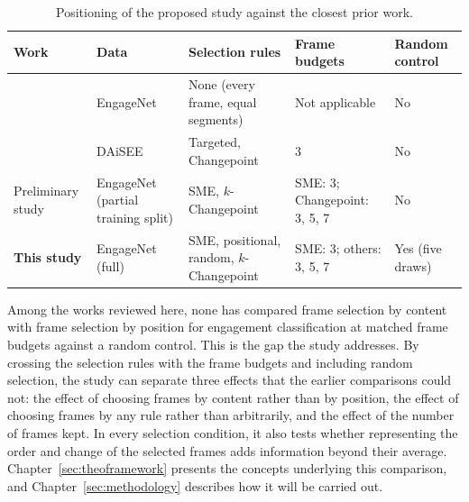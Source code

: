 \begin{table}[t]
   \centering
   \caption[Positioning of the proposed study]{Positioning of the proposed study against the closest prior work.}
   \label{tab:rw-positioning}
   \small
   \begin{tabular}{L{2.4cm}L{2.0cm}L{3.2cm}L{2.3cm}L{1.8cm}}
      \toprule
      Work & Data & Selection rules & Frame budgets & Random control \\
      \midrule
       & EngageNet & None (every frame, equal segments) & Not applicable & No \\
       & DAiSEE & Targeted, Changepoint & 3 & No \\
      Preliminary study & EngageNet (partial training split) & SME, $k$-Changepoint & SME: 3; Changepoint: 3, 5, 7 & No \\
      \textbf{This study} & EngageNet (full) & SME, positional, random, $k$-Changepoint & SME: 3; others: 3, 5, 7 & Yes (five draws) \\
      \bottomrule
   \end{tabular}
\end{table}

Among the works reviewed here, none has compared frame selection by content with frame selection by position for engagement classification at matched frame budgets against a random control. This is the gap the study addresses. By crossing the selection rules with the frame budgets and including random selection, the study can separate three effects that the earlier comparisons could not: the effect of choosing frames by content rather than by position, the effect of choosing frames by any rule rather than arbitrarily, and the effect of the number of frames kept. In every selection condition, it also tests whether representing the order and change of the selected frames adds information beyond their average. Chapter~\ref{sec:theoframework} presents the concepts underlying this comparison, and Chapter~\ref{sec:methodology} describes how it will be carried out.
